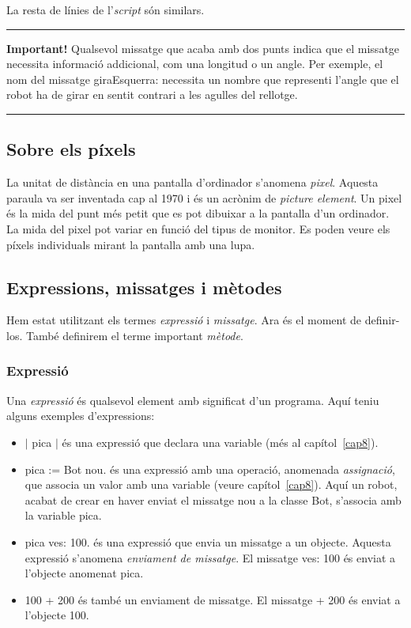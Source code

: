 \noindent
La resta de línies de l'\emph{script} són similars.

\noindent
\rule{\textwidth}{2pt}
\noindent
\textbf{Important!} Qualsevol missatge que acaba amb dos punts indica que el missatge necessita informació addicional, com una longitud o un angle. Per exemple, el nom del missatge \textsf{giraEsquerra:} necessita un nombre que representi l'angle que el robot ha de girar en sentit contrari a les agulles del rellotge.\\
\noindent
\rule{\textwidth}{2pt}

\subsection{Sobre els píxels}
La unitat de distància en una pantalla d'ordinador s'anomena \emph{pixel}. Aquesta paraula va ser inventada cap al 1970 i és un acrònim de \emph{picture element}. Un pixel és la mida del punt més petit que es pot dibuixar a la pantalla d'un ordinador. La mida del pixel pot variar en funció del tipus de monitor. Es poden veure els píxels individuals mirant la pantalla amb una lupa.

\subsection{Expressions, missatges i mètodes}

Hem estat utilitzant els termes \emph{expressió} i \emph{missatge}. Ara és el moment de definir-los. També definirem el terme important \emph{mètode}.

\subsubsection*{Expressió}
Una \emph{expressió} és qualsevol element amb significat d'un programa. Aquí teniu alguns exemples d'expressions:

\begin{itemize}
\item \textsf{$\mid$ pica $\mid$} és una expressió que declara una variable (més al capítol~\ref{cap8}). 
\item \textsf{pica := Bot nou.} és una expressió amb una operació, anomenada \emph{assignació}, que associa un valor amb una variable (veure capítol~\ref{cap8}). Aquí un robot, acabat de crear en haver enviat el missatge \textsf{nou} a la classe \textsf{Bot}, s'associa amb la variable \textsf{pica}.
\item \textsf{pica ves: 100.}  és una expressió que envia un missatge a un objecte. Aquesta expressió s'anomena \emph{enviament de missatge}. El missatge \textsf{ves: 100} és enviat a l'objecte anomenat \textsf{pica}.
\item \textsf{100 + 200} és també un enviament de missatge. El missatge \textsf{+ 200} és enviat a l'objecte \textsf{100}.
\end{itemize}

